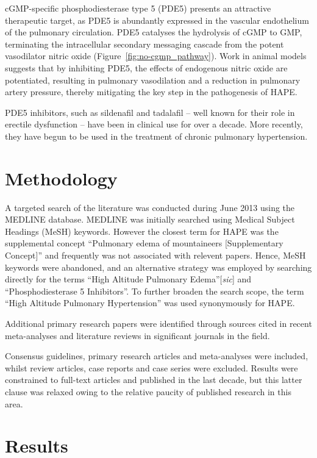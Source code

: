 \documentclass[12pt,a4paper]{article}
\begin{document}
cGMP-specific phosphodiesterase type 5 (PDE5) presents an attractive therapeutic target, as PDE5 is abundantly expressed in the vascular endothelium of the pulmonary circulation.\cite{Ahn:1991vt} PDE5 catalyses the hydrolysis of cGMP to GMP, terminating the intracellular secondary messaging cascade from the potent vasodilator nitric oxide (Figure~\ref{fig:no-cgmp_pathway}).\cite{Archer:2009cx} Work in animal models suggests that by inhibiting PDE5, the effects of endogenous nitric oxide are potentiated, resulting in pulmonary vasodilation and a reduction in pulmonary artery pressure, thereby mitigating the key step in the pathogenesis of HAPE.\cite{Zhao:2001kj}

PDE5 inhibitors, such as sildenafil and tadalafil -- well known for their role in erectile dysfunction -- have been in clinical use for over a decade. More recently, they have begun to be used in the treatment of chronic pulmonary hypertension.\cite{NationalPulmonaryHypertensionCentresoftheUKandIreland:2008jh}

\section*{Methodology}

A targeted search of the literature was conducted during June 2013 using the MEDLINE database. MEDLINE was initially searched using Medical Subject Headings (MeSH) keywords. However the closest term for HAPE was the supplemental concept ``Pulmonary edema of mountaineers [Supplementary Concept]'' and frequently was not associated with relevent papers. Hence, MeSH keywords were abandoned, and an alternative strategy was employed by searching directly for the terms ``High Altitude Pulmonary Edema''[\emph{sic}] and ``Phosphodiesterase 5 Inhibitors''. To further broaden the search scope, the term ``High Altitude Pulmonary Hypertension'' was used synonymously for HAPE.

Additional primary research papers were identified through sources cited in recent meta-analyses and literature reviews in significant journals in the field.

Consensus guidelines, primary research articles and meta-analyses were included, whilst review articles, case reports and case series were excluded. Results were constrained to full-text articles and published in the last decade, but this latter clause was relaxed owing to the relative paucity of published research in this area.

\section*{Results}
\end{document}
